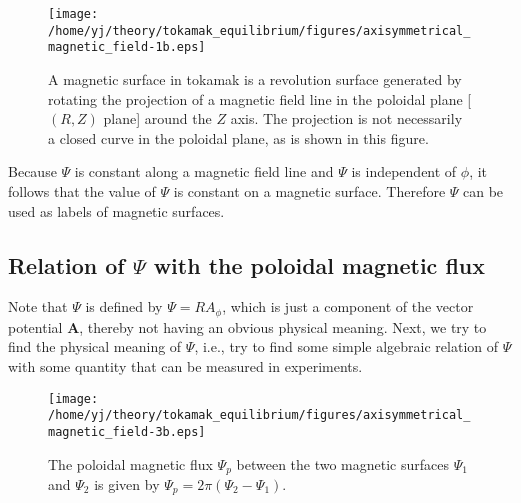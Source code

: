 \documentclass{article}
\begin{document}
\begin{figure}[h]
  \texttt{[image: /home/yj/theory/tokamak\_equilibrium/figures/axisymmetrical\_magnetic\_field-1b.eps]}
  \caption{\label{7-28-5}A magnetic surface in tokamak is a revolution surface
  generated by rotating the projection of a magnetic field line in the
  poloidal plane [$(R, Z)$ plane] around the $Z$ axis. The projection is not
  necessarily a closed curve in the poloidal plane, as is shown in this
  figure.}
\end{figure}

Because $\Psi$ is constant along a magnetic field line and $\Psi$ is
independent of $\phi$, it follows that the value of $\Psi$ is constant on a
magnetic surface. Therefore $\Psi$ can be used as labels of magnetic surfaces.

\subsection{\label{9-5-5}Relation of $\Psi$ with the poloidal magnetic flux}

Note that $\Psi$ is defined by $\Psi = R A_{\phi}$, which is just a component
of the vector potential $\mathbf{A}$, thereby not having an obvious physical
meaning. Next, we try to find the physical meaning of $\Psi$, i.e., try to
find some simple algebraic relation of $\Psi$ with some quantity that can be
measured in experiments.

\begin{figure}[h]
  \texttt{[image: /home/yj/theory/tokamak\_equilibrium/figures/axisymmetrical\_magnetic\_field-3b.eps]}
  \caption{\label{9-8-p1}The poloidal magnetic flux $\Psi_p$ between the two
  magnetic surfaces $\Psi_1$ and $\Psi_2$ is given by $\Psi_p = 2 \pi (\Psi_2
  - \Psi_1)$.}
\end{figure}
\end{document}
